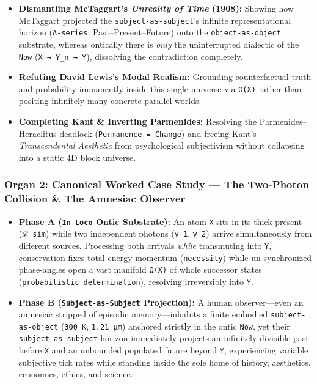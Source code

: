 \documentclass[
]{article}
\begin{document}
\begin{itemize}
\item
  \textbf{Dismantling McTaggart's \emph{Unreality of Time} (1908):}
  Showing how McTaggart projected the \texttt{subject-as-subject}'s
  infinite representational horizon (\texttt{A-series}:
  Past--Present--Future) onto the \texttt{object-as-object} substrate,
  whereas ontically there is \emph{only} the uninterrupted dialectic of
  the \texttt{Now} (\texttt{X~→~\textquotesingle{}Y\_n~→~Y}), dissolving
  the contradiction completely.
\item
  \textbf{Refuting David Lewis's Modal Realism:} Grounding
  counterfactual truth and probability immanently inside this single
  universe via \texttt{Ω(X)} rather than positing infinitely many
  concrete parallel worlds.
\item
  \textbf{Completing Kant \& Inverting Parmenides:} Resolving the
  Parmenides--Heraclitus deadlock (\texttt{Permanence~=~Change}) and
  freeing Kant's \emph{Transcendental Aesthetic} from psychological
  subjectivism without collapsing into a static 4D block universe.
\end{itemize}

\subsubsection{Organ 2: Canonical Worked Case Study --- The Two-Photon
Collision \& The Amnesiac
Observer}\label{organ-2-canonical-worked-case-study-the-two-photon-collision-the-amnesiac-observer}

\begin{itemize}
\item
  \textbf{Phase A (\texttt{In~Loco} Ontic Substrate):} An atom
  \texttt{X} sits in its thick present (\texttt{ℒ\_sim}) while two
  independent photons (\texttt{γ\_1}, \texttt{γ\_2}) arrive
  simultaneously from different sources. Processing both arrivals
  \emph{while} transmuting into \texttt{Y}, conservation fixes total
  energy-momentum (\texttt{necessity}) while un-synchronized
  phase-angles open a vast manifold \texttt{Ω(X)} of whole successor
  states (\texttt{probabilistic~determination}), resolving irreversibly
  into \texttt{Y}.
\item
  \textbf{Phase B (\texttt{Subject-as-Subject} Projection):} A human
  observer---even an amnesiac stripped of episodic memory---inhabits a
  finite embodied \texttt{subject-as-object} (\texttt{300~K},
  \texttt{1.21~μm}) anchored strictly in the ontic \texttt{Now}, yet
  their \texttt{subject-as-subject} horizon immediately projects an
  infinitely divisible past before \texttt{X} and an unbounded populated
  future beyond \texttt{Y}, experiencing variable subjective tick rates
  while standing inside the sole home of history, aesthetics, economics,
  ethics, and science.
\end{itemize}
\end{document}
